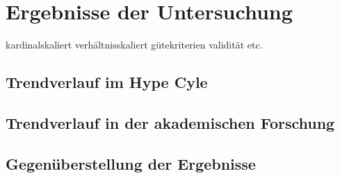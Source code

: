 \section{Ergebnisse der Untersuchung}

kardinalskaliert
verhältnisskaliert
gütekriterien validität etc.

\subsection{Trendverlauf im Hype Cyle}



\subsection{Trendverlauf in der akademischen Forschung}



\subsection{Gegenüberstellung der Ergebnisse}